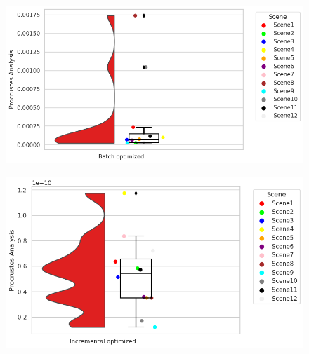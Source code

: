 \documentclass[report.tex]{subfiles}
\begin{document}
\begin{itemize}
\begin{figure}[H]
\centering
\begin{minipage}{.45\textwidth}
  \centering
  \includegraphics[scale=0.45]{Images/Procrustes_Analysis_batch.png}
  \label{fig:Procrustes_Analysis_batch.png}
\end{minipage}%
\begin{minipage}{.45\textwidth}
  \centering
  \includegraphics[scale=0.45]{Images/Procrustes_Analysis_incre.png}
  \label{fig:Procrustes_Analysis_incre.png}
\end{minipage}
\end{figure}



\end{itemize}
\end{document}
